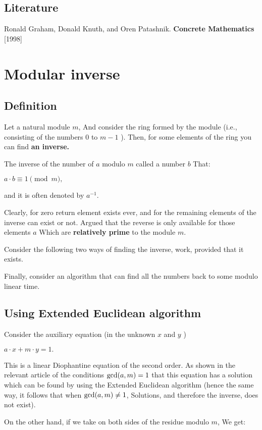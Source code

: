 \subsection{ Literature }

Ronald Graham, Donald Knuth, and Oren Patashnik. \textbf{Concrete Mathematics} [1998]
\section{ Modular inverse }
\subsection{ Definition }

Let a natural module $m$, And consider the ring formed by the module (i.e., consisting of the numbers $0$ to $m-1$ ). Then, for some elements of the ring you can find \textbf{an inverse.}

The inverse of the number of $a$ modulo $m$ called a number $b$ That:

$a \cdot b \equiv 1 \pmod m,$

and it is often denoted by $a ^ {-1}$.

Clearly, for zero return element exists ever, and for the remaining elements of the inverse can exist or not. Argued that the reverse is only available for those elements $a$ Which are \textbf{relatively prime} to the module $m$.

Consider the following two ways of finding the inverse, work, provided that it exists.

Finally, consider an algorithm that can find all the numbers back to some modulo linear time.

\subsection{ Using Extended Euclidean algorithm }

Consider the auxiliary equation (in the unknown $x$ and $y$ )

$a \cdot x + m \cdot y = 1.$

This is a linear Diophantine equation of the second order. As shown in the relevant article of the conditions ${\rm gcd} (a, m) = 1$ that this equation has a solution which can be found by using the Extended Euclidean algorithm (hence the same way, it follows that when ${\rm gcd} (a, m) \ne 1$, Solutions, and therefore the inverse, does not exist).

On the other hand, if we take on both sides of the residue modulo $m$, We get:

